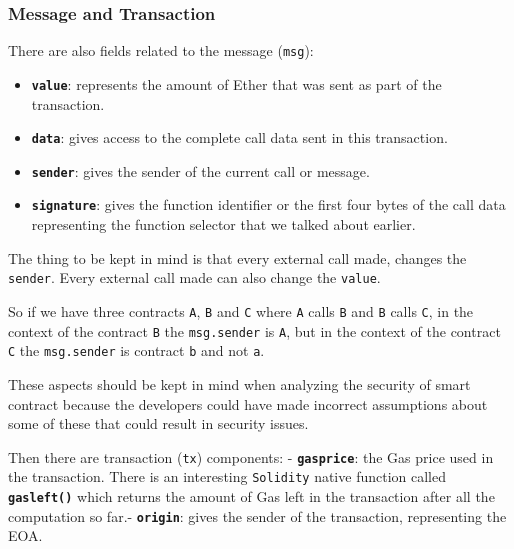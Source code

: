 \subsubsection{Message and Transaction}\label{message-and-transaction}

There are also fields related to the message (\texttt{msg}):

\begin{itemize}
\tightlist
\item
  \textbf{\texttt{value}}: represents the amount of Ether that was sent
  as part of the transaction.
\item
  \textbf{\texttt{data}}: gives access to the complete call data sent in
  this transaction.
\item
  \textbf{\texttt{sender}}: gives the sender of the current call or
  message.
\item
  \textbf{\texttt{signature}}: gives the function identifier or the
  first four bytes of the call data representing the function selector
  that we talked about earlier.
\end{itemize}

The thing to be kept in mind is that every external call made, changes
the \texttt{sender}. Every external call made can also change the
\texttt{value}.

So if we have three contracts \texttt{A}, \texttt{B} and \texttt{C}
where \texttt{A} calls \texttt{B} and \texttt{B} calls \texttt{C}, in
the context of the contract \texttt{B} the \texttt{msg.sender} is
\texttt{A}, but in the context of the contract \texttt{C} the
\texttt{msg.sender} is contract \texttt{b} and not \texttt{a}.

These aspects should be kept in mind when analyzing the security of
smart contract because the developers could have made incorrect
assumptions about some of these that could result in security issues.

Then there are transaction (\texttt{tx}) components: -
\textbf{\texttt{gasprice}}: the Gas price used in the transaction. There
is an interesting \texttt{Solidity} native function called
\textbf{\texttt{gasleft()}} which returns the amount of Gas left in the
transaction after all the computation so far.- \textbf{\texttt{origin}}:
gives the sender of the transaction, representing the EOA.
